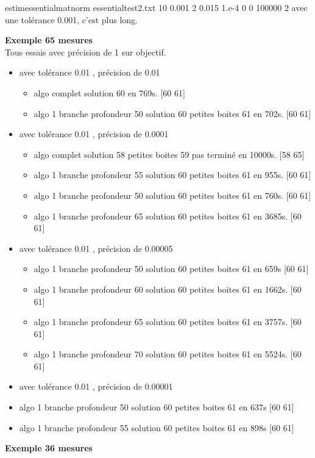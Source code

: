 \documentclass{article}
\begin{document}
estimessentialmatnorm essentialtest2.txt 10 0.001 2 0.015 1.e-4 0 0 100000 2 
avec une tol\'erance 0.001, c'est plus long.


{\bf Exemple 65 mesures} \\
Tous essais avec pr\'ecision de 1 sur objectif.
\begin{itemize}

\item avec tol\'erance 0.01 , pr\'ecision de 0.01
\begin{itemize}
\item algo complet solution 60  en 769s. [60 61]
\item algo 1 branche profondeur 50   solution 60 petites boites 61 en 702s. [60 61] 
\end{itemize}
\item avec tol\'erance 0.01 , pr\'ecision de 0.0001
\begin{itemize}
\item algo complet  solution 58  petites boites 59 pas terminé en 10000s.   [58 65]
\item algo 1 branche profondeur 55   solution 60 petites boites 61 en 955s. [60 61] 
\item algo 1 branche profondeur 50   solution 60 petites boites 61 en 760s. [60 61] 
\item algo 1 branche profondeur 65   solution 60 petites boites 61 en 3685s. [60 61]
\end{itemize}
\item avec tol\'erance 0.01 , pr\'ecision de 0.00005
\begin{itemize}
\item algo 1 branche profondeur 50   solution 60 petites boites 61  en 659s [60 61]
\item algo 1 branche profondeur 60   solution 60 petites boites 61  en 1662s. [60 61]
\item algo 1 branche profondeur 65   solution 60 petites boites 61  en 3757s. [60 61]
\item algo 1 branche profondeur 70   solution 60 petites boites 61  en 5524s. [60 61]
\end{itemize}
\item avec tol\'erance 0.01 , pr\'ecision de 0.00001
\item algo 1 branche profondeur 50   solution 60 petites boites 61  en 637s [60 61]
\item algo 1 branche profondeur 55   solution 60 petites boites 61  en 898s [60 61]
\end{itemize}
{\bf Exemple 36 mesures} \\
\end{document}
